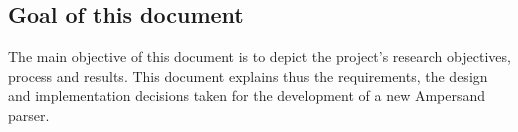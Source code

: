 
\subsection{Goal of this document}
The main objective of this document is to depict the project's research objectives, process and results.
This document explains thus the requirements, the design and implementation decisions taken for the development of a new Ampersand parser.
